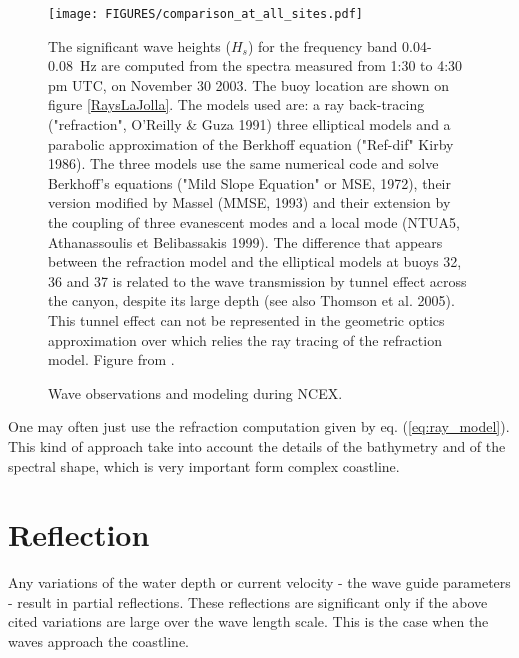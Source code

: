 \begin{figure}
\centerline{\texttt{[image: FIGURES/comparison\_at\_all\_sites.pdf]}}
  \caption{Wave observations and modeling during NCEX.}
  {The significant wave heights ($H_s$) for the frequency band 
   0.04-0.08~Hz are computed from the spectra measured from 1:30 to
   4:30 pm UTC, on November 30 2003. The buoy location are shown on figure
   \ref{RaysLaJolla}. The models used are: a ray back-tracing ("refraction", O'Reilly \& Guza 1991) 
   three elliptical models and a parabolic approximation of the Berkhoff equation
   ("Ref-dif" Kirby 1986\nocite{Kirby1986c}). The three models use the same numerical
   code and solve Berkhoff's equations ("Mild Slope Equation" or MSE,
  1972\nocite{Berkhoff1972}), their version modified by Massel  (MMSE,
  1993\nocite{Massel1993}) and their extension by the coupling of three evanescent modes and a local mode
  (NTUA5, Athanassoulis et Belibassakis 1999\nocite{Athanassoulis&Belibassakis1999}).
  The difference that appears between the refraction model and the elliptical models 
  at buoys 32, 36 and 37 is related to the wave transmission by tunnel effect across the canyon,
  despite its large depth (see also Thomson et al. 2005\nocite{Thomson&al.2005}). This tunnel effect
  can not be represented in the geometric optics approximation over which relies the ray tracing of the
  refraction model. Figure from \cite{Magne&al.2007}.}
 \label{NCEXcomp}
  \end{figure}

One may often just use the refraction computation given by eq. (\ref{eq:ray_model}).
This kind of approach take into account the details of the bathymetry
and of the spectral shape, which is very important form complex
coastline.

\section{Reflection}
Any variations of the water depth or current velocity - the wave guide parameters - result in partial reflections. These reflections are significant
only if the above cited variations are large over the wave length scale. This is the case when the waves approach the coastline.

